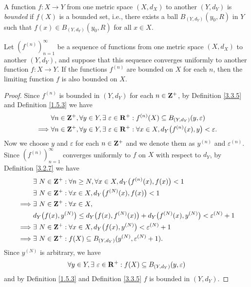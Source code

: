 \begin{definition}\label{3.3.5}
    A function \(f : X \to Y\) from one metric space \((X, d_X)\) to another \((Y, d_Y)\) is \emph{bounded} if \(f(X)\) is a bounded set, i.e., there exists a ball \(B_{(Y, d_Y)}(y_0, R)\) in \(Y\) such that \(f(x) \in B_{(Y, d_Y)}(y_0, R)\) for all \(x \in X\).
\end{definition}

\begin{proposition}\label{3.3.6}
    Let \((f^{(n)})_{n = 1}^\infty\) be a sequence of functions from one metric space \((X, d_X)\) to another \((Y, d_Y)\), and suppose that this sequence converges uniformly to another function \(f : X \to Y\).
    If the functions \(f^{(n)}\) are bounded on \(X\) for each \(n\), then the limiting function \(f\) is also bounded on \(X\).
\end{proposition}

\begin{proof}
    Since \(f^{(n)}\) is bounded in \((Y, d_Y)\) for each \(n \in \mathbf{Z}^+\), by Definition \ref{3.3.5} and Definition \ref{1.5.3} we have
    \begin{align*}
                 & \forall n \in \Z^+, \forall y \in Y, \exists\ \varepsilon \in \R^+ : f^{(n)}(X) \subseteq B_{(Y, d_Y)}(y, \varepsilon)          \\
        \implies & \forall n \in \Z^+, \forall y \in Y, \exists\ \varepsilon \in \R^+ : \forall x \in X, d_Y\big(f^{(n)}(x), y\big) < \varepsilon.
    \end{align*}
    Now we choose \(y\) and \(\varepsilon\) for each \(n \in \mathbf{Z}^+\) and we denote them as \(y^{(n)}\) and \(\varepsilon^{(n)}\).
    Since \((f^{(n)})_{n = 1}^\infty\) converges uniformly to \(f\) on \(X\) with respect to \(d_Y\), by Definition \ref{3.2.7} we have
    \begin{align*}
                 & \exists\ N \in \mathbf{Z}^+ : \forall n \geq N, \forall x \in X, d_Y\big(f^{(n)}(x), f(x)\big) < 1                               \\
                 & \exists\ N \in \mathbf{Z}^+ : \forall x \in X, d_Y\big(f^{(N)}(x), f(x)\big) < 1                                                 \\
        \implies & \exists\ N \in \mathbf{Z}^+ : \forall x \in X,                                                                                   \\
                 & d_Y\big(f(x), y^{(N)}\big) \leq d_Y\big(f(x), f^{(N)}(x)\big) + d_Y\big(f^{(N)}(x), y^{(N)}\big) < \varepsilon^{(N)} + 1 \\
        \implies & \exists\ N \in \mathbf{Z}^+ : \forall x \in X, d_Y\big(f(x), y^{(N)}\big) < \varepsilon^{(N)} + 1                                \\
        \implies & \exists\ N \in \mathbf{Z}^+ : f(X) \subseteq B_{(Y, d_Y)}(y^{(N)}, \varepsilon^{(N)} + 1).
    \end{align*}
    Since \(y^{(N)}\) is arbitrary, we have
    \[
        \forall y \in Y, \exists\ \varepsilon \in \mathbf{R}^+ : f(X) \subseteq B_{(Y, d_Y)}(y, \varepsilon)
    \]
    and by Definition \ref{1.5.3} and Definition \ref{3.3.5} \(f\) is bounded in \((Y, d_Y)\).
\end{proof}

